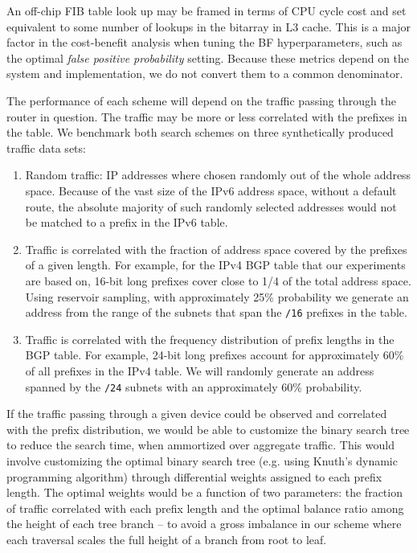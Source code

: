 \documentclass[conference,compsoc]{IEEEtran}
\begin{document}
An off-chip FIB table look up may be framed in terms of
CPU cycle cost and set equivalent to some number of lookups in the 
bitarray in L3 cache. This is a major factor in the cost-benefit analysis 
when tuning the BF hyperparameters, such as the optimal 
\emph{false positive probability}
setting. Because these metrics depend on the system and implementation, we
do not convert them to a common denominator.

The performance of each scheme will depend on the traffic passing
through the router in question. The traffic may be more or less correlated
with the prefixes in the table. We benchmark both search schemes on three
synthetically produced traffic data sets:

\begin{enumerate}
\item Random traffic: IP addresses where chosen randomly out of the whole
        address space. Because of the vast size of the IPv6 address space,
        without a default route, the absolute majority of such randomly 
        selected addresses would not be matched to a prefix in the IPv6 table.
\item Traffic is correlated with the fraction of address space covered by
  the prefixes of a given length. For example, for the IPv4 BGP table that 
    our experiments are based on, 16-bit long prefixes cover close to 1/4
    of the total address space. Using reservoir sampling, with approximately
    25\% probability we generate an
    address from the range of the subnets that span the \texttt{/16} prefixes
    in the table.
\item Traffic is correlated with the frequency distribution of prefix
    lengths in the BGP table. For example, 24-bit long prefixes account
    for approximately 60\% of all prefixes in the IPv4 table. We will randomly
    generate an address spanned by the \texttt{/24} subnets with an
    approximately 60\% probability.
\end{enumerate}

If the traffic passing through a given device could be observed and correlated
with the prefix distribution, we would be able to customize the binary
search tree to reduce the search time, when ammortized over aggregate traffic.
This would involve customizing the optimal binary search tree (e.g. using
Knuth's dynamic programming algorithm) through differential weights
assigned to each prefix length. The
optimal weights would be a function of two parameters:
the fraction of traffic correlated with each prefix length and the 
optimal balance ratio among the height of each tree branch --
to avoid a gross imbalance in our scheme where each traversal scales the full
height of a branch from root to leaf.
\end{document}
